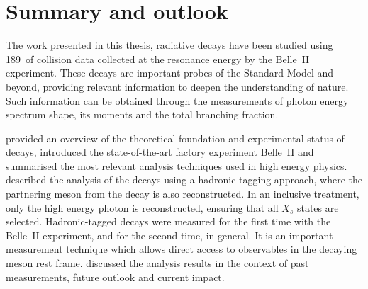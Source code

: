 \chapter{Summary and outlook}\label{ch:summary}

The work presented in this thesis, radiative \BtoXsgamma decays have been studied using 189~\invfb of \epem collision data collected at the \FourS resonance energy by the Belle~II experiment.
These decays are important probes of the Standard Model and beyond, providing relevant information to deepen the understanding of nature.
Such information can be obtained through the measurements of \BtoXsgamma photon energy spectrum shape, its moments and the total branching fraction.

 provided an overview of the theoretical foundation and experimental status of \mbox{\BtoXsgamma} decays, 
introduced the state-of-the-art \B factory experiment Belle~II and summarised the most relevant analysis techniques used in high energy physics.
 described the analysis
of the \BtoXsgamma decays using a hadronic-tagging approach, where the partnering \B meson from the \FourS decay is also reconstructed.
In an inclusive treatment, only the high energy photon is reconstructed, ensuring that all $X_s$ states are selected.
Hadronic-tagged \BtoXsgamma decays were measured for the first time with the Belle~II experiment, and for the second time, in general.
It is an important measurement technique which allows direct access to observables in the decaying \B meson rest frame.
 discussed the analysis results in the context of past measurements, future outlook and current impact.

